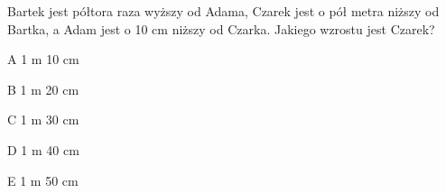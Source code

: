 \begin{tresc}
Bartek jest półtora raza wyższy od Adama, Czarek jest o pół metra niższy od Bartka, a Adam jest o 10 cm niższy od Czarka. Jakiego wzrostu jest Czarek?
\end{tresc}
\begin{wariant}{A} 1 m 10 cm \end{wariant}
\begin{wariant}{B} 1 m 20 cm \end{wariant}
\begin{wariant}{C} 1 m 30 cm \end{wariant}
\begin{wariant}{D} 1 m 40 cm \end{wariant}
\begin{wariant}{E} 1 m 50 cm \end{wariant}
